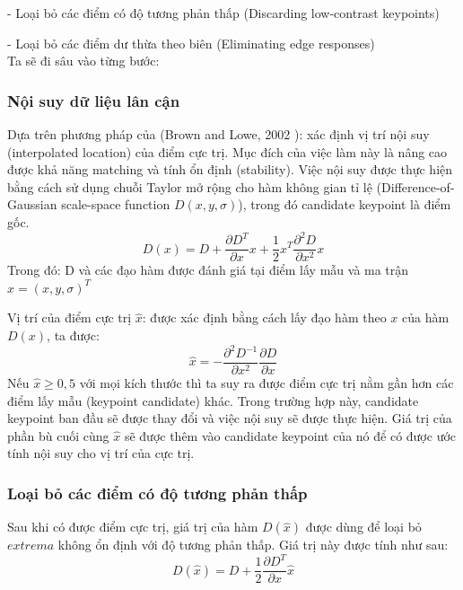 \documentclass[conference]{IEEEtran}
\begin{document}
	
	- Loại bỏ các điểm có độ tương phản thấp (Discarding low-contrast keypoints)
	
	
	- Loại bỏ các điểm dư thừa theo biên (Eliminating edge responses)\\
	
	Ta sẽ đi sâu vào từng bước:
	
	\subsubsection{Nội suy dữ liệu lân cận}
Dựa trên phương pháp của (Brown and Lowe, 2002 \cite{baibao2}): xác định vị trí nội suy (interpolated location) của điểm cực trị. Mục đích của việc làm này là nâng cao được khả năng matching và tính ổn định (stability).
Việc nội suy được thực hiện bằng cách sử dụng chuỗi Taylor mở rộng cho hàm không gian tỉ lệ (Difference-of-Gaussian scale-space function $D(x, y, \sigma)$), trong đó candidate keypoint là điểm gốc. 
\begin{equation}
D(x) = D + \frac{\partial D^T}{\partial x}x + \frac{1}{2}x^T \frac{\partial^2 D}{\partial x^2}x
\end{equation}
Trong đó: D và các đạo hàm được đánh giá tại điểm lấy mẫu và ma trận $x= (x, y, \sigma )^T$

Vị trí của điểm cực trị $\hat{x}$: được xác định bằng cách lấy đạo hàm theo $x$ của hàm $D(x)$, ta được: 
\begin{equation}
\hat{x} = - \frac{\partial^2 D^{-1}}{\partial x^2}\frac{\partial D}{\partial x}
\end{equation}
Nếu ${\hat{x} \geq 0,5}$ với mọi kích thước thì ta suy ra được điểm cực trị nằm gần hơn các điểm lấy mẫu (keypoint candidate) khác. Trong trường hợp này, candidate keypoint ban đầu sẽ được thay đổi và việc nội suy sẽ được thực hiện. Giá trị của phần bù cuối cùng $\hat{x}$ sẽ được thêm vào candidate keypoint của nó để có được ước tính nội suy cho vị trí của cực trị.

	\subsubsection{Loại bỏ các điểm có độ tương phản thấp}
	
Sau khi có được điểm cực trị, giá trị của hàm $D(\hat{x})$ được dùng để loại bỏ $extrema$ không ổn định với độ tương phản thấp. Giá trị này được tính như sau: 
\begin{equation}
D(\hat{x}) = D + \frac{1}{2} \frac{\partial D^T}{\partial x} \hat{x}
\end{equation}
	
\end{document}
